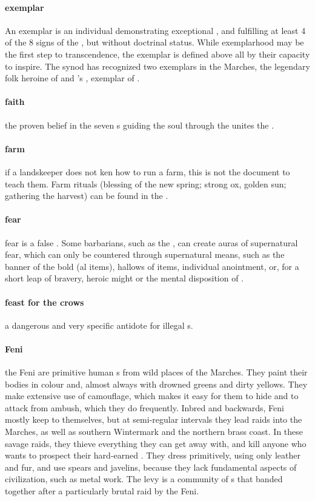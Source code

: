 \paragraph{exemplar} An exemplar is an individual demonstrating exceptional , and fulfilling at least 4 of the 8 signs of the , but without doctrinal status. While exemplarhood may be the first step to transcendence, the exemplar is defined above all by their capacity to inspire. The synod has recognized two exemplars in the Marches, the legendary folk heroine  of  and 's , exemplar of .
\paragraph{faith} the proven belief in the seven s guiding the soul through the  unites the .
\paragraph{farm} if a landskeeper does not ken how to run a farm, this is not the document to teach them. Farm rituals (blessing of the new spring; strong ox, golden sun; gathering the harvest) can be found in the .
\paragraph{fear} fear is a false . Some barbarians, such as the , can create auras of supernatural fear, which can only be countered through supernatural means, such as the banner of the bold (al items), hallows of items, individual anointment, or, for a short leap of bravery, heroic might or the mental disposition of . 
\paragraph{feast for the crows} a dangerous and very specific antidote for illegal s.
\paragraph{Feni} the Feni are primitive human s from wild places of the Marches. They paint their bodies in colour and, almost always with drowned greens and dirty yellows. They make extensive use of camouflage, which makes it easy for them to hide and to attack from ambush, which they do frequently. Inbred and backwards, Feni mostly keep to themselves, but at semi-regular intervals they lead raids into the Marches, as well as southern Wintermark and the northern brass coast. In these savage raids, they thieve everything they can get away with, and kill anyone who wants to prospect their hard-earned . They dress primitively, using only leather and fur, and use spears and javelins, because they lack fundamental aspects of civilization, such as metal work. The  levy is a community of s that banded together after a particularly brutal raid by the Feni.
